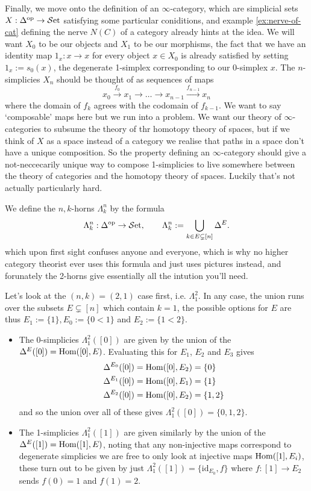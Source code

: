 Finally, we move onto the definition of an $\infty$-category, which are simplicial sets $X : \Delta^\text{op} \to {\mathcal{S}\text{et}}$ satisfying some particular coniditions, and example \ref{ex:nerve-of-cat} defining the nerve $N(C)$ of a category already hints at the idea. We will want $X_0$ to be our objects and $X_1$ to be our morphisms, the fact that we have an identity map $1_x : x \to x$ for every object $x \in X_0$ is already satisfied by setting $1_x := s_0(x)$, the degenerate 1-simplex corresponding to our 0-simplex $x$. The $n$-simplicies $X_n$ should be thought of as sequences of maps
	\[
	x_0 \xrightarrow{f_0} x_1 \to \dots \to x_{n-1} \xrightarrow{f_{n-1}} x_n
	\]
	where the domain of $f_k$ agrees with the codomain of $f_{k-1}$. We want to say `composable' maps here but we run into a problem. We want our theory of $\infty$-categories to subsume the theory of thr homotopy theory of spaces, but if we think of $X$ as a space instead of a category we realise that paths in a space don't have a unique composition. So the property defining an $\infty$-category should give a not-neccecarily unique way to compose 1-simplicies to live somewhere between the theory of categories and the homotopy theory of spaces. Luckily that's not actually particularly hard.

We define the $n,k$-horns $\Lambda^n_k$ by the formula 
	\[
	\Lambda^n_k : \Delta^\text{op} \to {\mathcal{S}\text{et}},
	\qquad
	\Lambda^n_k := \bigcup_{k \in E \subsetneq [n]} \Delta^E.
	\]
which upon first sight confuses anyone and everyone, which is why no higher category theorist ever uses this formula and just uses pictures instead, and forunately the 2-horns give essentially all the intution you'll need.

Let's look at the $(n,k) = (2,1)$ case first, i.e. $\Lambda^2_1$. In any case, the union runs over the subsets $E \subsetneq [n]$ which contain $k=1$, the possible options for $E$ are thus $E_1 := \{1\}, E_0 := \{0<1\}$ and $E_2 := \{1<2\}$.
\begin{itemize}
	\item{
	The 0-simplicies $\Lambda^2_1([0])$ are given by the union of the $\Delta^E([0]) = {\text{Hom}}([0],E)$.
	Evaluating this for $E_1$, $E_2$ and $E_3$ gives
		\begin{align*}
			\Delta^{E_0}([0]) &= {\text{Hom}}([0],E_2) = \{0\} \\
			\Delta^{E_1}([0]) &= {\text{Hom}}([0],E_1) = \{1\} \\
			\Delta^{E_2}([0]) &= {\text{Hom}}([0],E_2) = \{1,2\}
		\end{align*}
	and so the union over all of these gives $\Lambda^2_1([0]) = \{0,1,2\}$. 
	}
	\item{
	The 1-simplicies $\Lambda^2_1([1])$ are given similarly by the union of the $\Delta^E([1]) = {\text{Hom}}([1],E)$, noting that any non-injective maps correspond to degenerate simplicies we are free to only look at injective maps ${\text{Hom}}([1],E_i)$, these turn out to be given by just $\Lambda^2_1([1]) = \{\text{id}_{E_0}, f\}$ where $f : [1] \to E_2$ sends $f(0)=1$ and $f(1)=2$. 
	}
\end{itemize}

